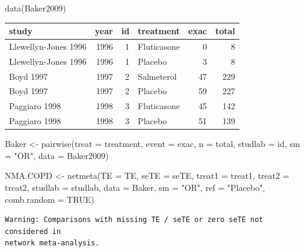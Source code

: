 \documentclass[
  letterpaper,
  DIV=11,
  numbers=noendperiod]{scrreprt}
\newenvironment{Shaded}{\begin{snugshade}}{\end{snugshade}}
\newcommand{\AttributeTok}[1]{\textcolor[rgb]{0.40,0.45,0.13}{#1}}
\newcommand{\ConstantTok}[1]{\textcolor[rgb]{0.56,0.35,0.01}{#1}}
\newcommand{\FunctionTok}[1]{\textcolor[rgb]{0.28,0.35,0.67}{#1}}
\newcommand{\NormalTok}[1]{\textcolor[rgb]{0.00,0.23,0.31}{#1}}
\newcommand{\OtherTok}[1]{\textcolor[rgb]{0.00,0.23,0.31}{#1}}
\newcommand{\StringTok}[1]{\textcolor[rgb]{0.13,0.47,0.30}{#1}}
\begin{document}
\begin{Shaded}
\begin{Highlighting}[]
\FunctionTok{data}\NormalTok{(Baker2009)}
\end{Highlighting}
\end{Shaded}

\begin{tabular}{l|r|r|l|r|r}
\hline
study & year & id & treatment & exac & total\\
\hline
Llewellyn-Jones 1996 & 1996 & 1 & Fluticasone & 0 & 8\\
\hline
Llewellyn-Jones 1996 & 1996 & 1 & Placebo & 3 & 8\\
\hline
Boyd 1997 & 1997 & 2 & Salmeterol & 47 & 229\\
\hline
Boyd 1997 & 1997 & 2 & Placebo & 59 & 227\\
\hline
Paggiaro 1998 & 1998 & 3 & Fluticasone & 45 & 142\\
\hline
Paggiaro 1998 & 1998 & 3 & Placebo & 51 & 139\\
\hline
\end{tabular}

\begin{Shaded}
\begin{Highlighting}[]
\NormalTok{Baker }\OtherTok{\textless{}{-}} \FunctionTok{pairwise}\NormalTok{(}\AttributeTok{treat =}\NormalTok{ treatment,}
                  \AttributeTok{event =}\NormalTok{ exac,}
                  \AttributeTok{n =}\NormalTok{ total,}
                  \AttributeTok{studlab =}\NormalTok{ id,}
                  \AttributeTok{sm =} \StringTok{"OR"}\NormalTok{,}
                  \AttributeTok{data =}\NormalTok{ Baker2009)}

\NormalTok{NMA.COPD }\OtherTok{\textless{}{-}} \FunctionTok{netmeta}\NormalTok{(}\AttributeTok{TE =}\NormalTok{ TE, }\AttributeTok{seTE =}\NormalTok{ seTE, }\AttributeTok{treat1 =}\NormalTok{ treat1, }\AttributeTok{treat2 =}\NormalTok{ treat2,}
                    \AttributeTok{studlab =}\NormalTok{ studlab, }\AttributeTok{data =}\NormalTok{ Baker, }\AttributeTok{sm =} \StringTok{"OR"}\NormalTok{, }\AttributeTok{ref =} \StringTok{"Placebo"}\NormalTok{,}
                    \AttributeTok{comb.random =} \ConstantTok{TRUE}\NormalTok{)}
\end{Highlighting}
\end{Shaded}

\begin{verbatim}
Warning: Comparisons with missing TE / seTE or zero seTE not considered in
network meta-analysis.
\end{verbatim}
\end{document}
